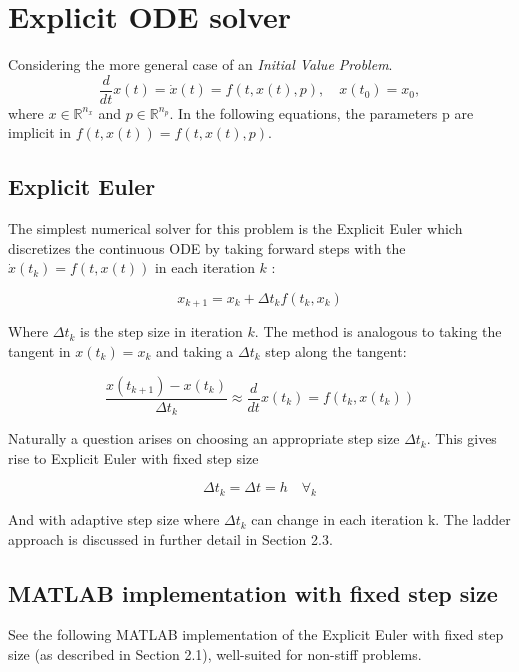 \section{Explicit ODE solver}
Considering the more general case of an \textit{Initial Value Problem}.
$$
\frac{d}{d t} x(t)= \dot{x}(t)=f(t, x(t), p), \quad x\left(t_{0}\right)=x_{0},
$$
where $x \in \mathbb{R}^{n_{x}}$ and $p \in \mathbb{R}^{n_{p}}$. In the following equations, the parameters p are implicit in $f(t, x(t)) = f(t, x(t), p)$.

\subsection{Explicit Euler}
The simplest numerical solver for this problem is the Explicit Euler which discretizes the continuous ODE by taking forward steps with the $\dot{x}(t_k) = f(t, x(t))$ in each iteration $k$ \cite{JrgensenScientificEquations}:

\begin{equation}
    x_{k+1}=x_{k}+\Delta t_k f\left(t_{k}, x_{k}\right)
\end{equation}

Where $\Delta t_k$ is the step size in iteration $k$. The method is analogous to taking the tangent in $x(t_k) = x_k$ and taking a $\Delta t_k$ step along the tangent:

\begin{equation}
\frac{x\left(t_{k+1}\right)-x\left(t_{k}\right)}{\Delta t_{k}} \approx \frac{d}{d t} x\left(t_{k}\right)=f\left(t_{k}, x\left(t_{k}\right)\right)
\end{equation}

Naturally a question arises on choosing an appropriate step size $\Delta t_k$. This gives rise to Explicit Euler with fixed step size

\begin{equation*}
    \Delta t_k = \Delta t = h \quad \forall_k
\end{equation*}

And with adaptive step size where $\Delta t_k$ can change in each iteration k. The ladder approach is discussed in further detail in Section 2.3.

\subsection{MATLAB implementation with fixed step size}
See the following MATLAB implementation of the Explicit Euler with fixed step size (as described in Section 2.1), well-suited for non-stiff problems.

